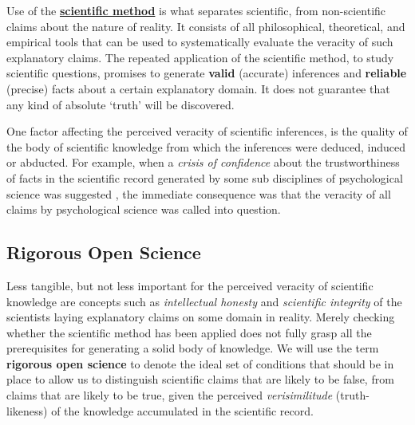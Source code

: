 \documentclass[12pt,]{book}
\begin{document}
Use of the \href{https://en.wikipedia.org/wiki/Scientific_method}{\textbf{scientific method}} is what separates scientific, from non-scientific claims about the nature of reality. It consists of all philosophical, theoretical, and empirical tools that can be used to systematically evaluate the veracity of such explanatory claims. The repeated application of the scientific method, to study scientific questions, promises to generate \textbf{valid} (accurate) inferences and \textbf{reliable} (precise) facts about a certain explanatory domain. It does not guarantee that any kind of absolute `truth' will be discovered.

One factor affecting the perceived veracity of scientific inferences, is the quality of the body of scientific knowledge from which the inferences were deduced, induced or abducted. For example, when a \emph{crisis of confidence} about the trustworthiness of facts in the scientific record generated by some sub disciplines of psychological science was suggested \citep{pashler2012a}, the immediate consequence was that the veracity of all claims by psychological science was called into question.

\hypertarget{rigorous-open-science}{%
\subsection*{Rigorous Open Science}\label{rigorous-open-science}}

Less tangible, but not less important for the perceived veracity of scientific knowledge are concepts such as \emph{intellectual honesty} and \emph{scientific integrity} of the scientists laying explanatory claims on some domain in reality. Merely checking whether the scientific method has been applied does not fully grasp all the prerequisites for generating a solid body of knowledge. We will use the term \textbf{rigorous open science} to denote the ideal set of conditions that should be in place to allow us to distinguish scientific claims that are likely to be false, from claims that are likely to be true, given the perceived \emph{verisimilitude} (truth-likeness) of the knowledge accumulated in the scientific record.
\end{document}
